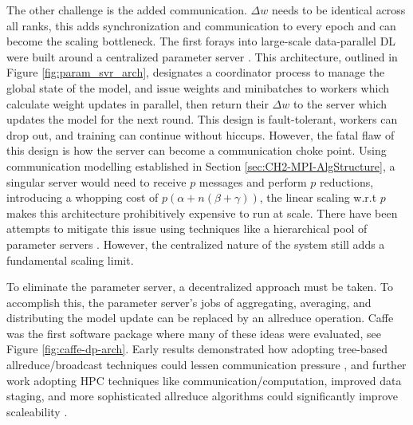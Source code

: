 The other challenge is the added communication.
$\Delta w$ needs to be identical across all ranks, this adds synchronization and communication to every epoch and can become the scaling bottleneck.
The first forays into large-scale data-parallel \gls{DL} were built around a centralized parameter server \cite{Dean2012DistBelif, Chilimbi2014ProjectAdam}.
This architecture, outlined in Figure \ref{fig:param_svr_arch}, designates a coordinator process to manage the global state of the model, and issue weights and minibatches to workers which calculate weight updates in parallel, then return their $\Delta w$ to the server which updates the model for the next round.
This design is fault-tolerant, workers can drop out, and training can continue without hiccups. 
However, the fatal flaw of this design is how the server can become a communication choke point.
Using communication modelling established in Section \ref{sec:CH2-MPI-AlgStructure}, a singular server would need to receive $p$ messages and perform $p$ reductions, introducing a whopping cost of $p(\alpha+n(\beta+\gamma))$, the linear scaling w.r.t $p$ makes this architecture prohibitively expensive to run at scale.
There have been attempts to mitigate this issue using techniques like a hierarchical pool of parameter servers \cite{Gupta2016Rudra}.
However, the centralized nature of the system still adds a fundamental scaling limit.



To eliminate the parameter server, a decentralized approach must be taken.
To accomplish this, the parameter server's jobs of aggregating, averaging, and distributing the model update can be replaced by an allreduce operation.
Caffe was the first software package where many of these ideas were evaluated, see Figure \ref{fig:caffe-dp-arch}.
Early results demonstrated how adopting tree-based allreduce/broadcast techniques could lessen communication pressure \cite{Iandola2016FireCaffe}, and further work adopting \gls{HPC} techniques like communication/computation, improved data staging, and more sophisticated allreduce algorithms could significantly improve scaleability \cite{Awan2017SCaffe}.




